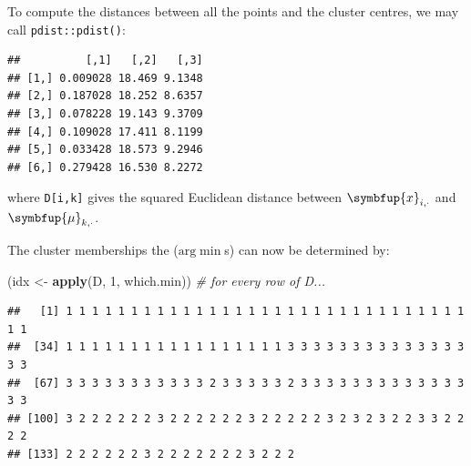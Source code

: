 \documentclass[10pt,b5paper,krantz1]{krantz}
\newenvironment{Shaded}{\begin{snugshade}}{\end{snugshade}}
\newcommand{\CommentTok}[1]{\textcolor[rgb]{0.37,0.37,0.37}{\textit{#1}}}
\newcommand{\DecValTok}[1]{\textcolor[rgb]{0.06,0.06,0.06}{#1}}
\newcommand{\KeywordTok}[1]{\textcolor[rgb]{0.27,0.27,0.27}{\textbf{#1}}}
\newcommand{\NormalTok}[1]{#1}
\newcommand{\OperatorTok}[1]{\textcolor[rgb]{0.43,0.43,0.43}{\textbf{#1}}}
\newcommand{\StringTok}[1]{\textcolor[rgb]{0.5,0.5,0.5}{#1}}
\renewcommand{\mathbf}[1]{\symbfup{#1}}
\renewcommand{\boldsymbol}[1]{\symbfup{#1}}
\begin{document}
To compute the distances between all the points and the cluster centres,
we may call \texttt{pdist::pdist()}:

\begin{Shaded}
\end{Shaded}

\begin{verbatim}
##          [,1]   [,2]   [,3]
## [1,] 0.009028 18.469 9.1348
## [2,] 0.187028 18.252 8.6357
## [3,] 0.078228 19.143 9.3709
## [4,] 0.109028 17.411 8.1199
## [5,] 0.033428 18.573 9.2946
## [6,] 0.279428 16.530 8.2272
\end{verbatim}

where \texttt{D{[}i,k{]}} gives the squared Euclidean distance between
\(\mathbf{x}_{i,\cdot}\) and \(\boldsymbol\mu_{k,\cdot}\).

The cluster memberships the (\(\mathrm{arg}\min\)s)
can now be determined by:

\begin{Shaded}
\begin{Highlighting}[]
\NormalTok{(idx <-}\StringTok{ }\KeywordTok{apply}\NormalTok{(D, }\DecValTok{1}\NormalTok{, which.min)) }\CommentTok{# for every row of D...}
\end{Highlighting}
\end{Shaded}

\begin{verbatim}
##   [1] 1 1 1 1 1 1 1 1 1 1 1 1 1 1 1 1 1 1 1 1 1 1 1 1 1 1 1 1 1 1 1 1 1
##  [34] 1 1 1 1 1 1 1 1 1 1 1 1 1 1 1 1 1 3 3 3 3 3 3 3 3 3 3 3 3 3 3 3 3
##  [67] 3 3 3 3 3 3 3 3 3 3 3 2 3 3 3 3 3 2 3 3 3 3 3 3 3 3 3 3 3 3 3 3 3
## [100] 3 2 2 2 2 2 2 3 2 2 2 2 2 2 3 2 2 2 2 2 3 2 3 2 3 2 2 3 3 2 2 2 2
## [133] 2 2 2 2 2 2 3 2 2 2 2 2 2 2 3 2 2 2
\end{verbatim}

\begin{Shaded}
\end{Shaded}
\end{document}

